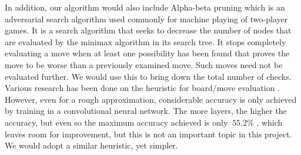 \documentclass[11pt]{article}
\begin{document}
In addition, our algorithm would also include Alpha-beta pruning which is an adversarial search algorithm used commonly for machine playing of two-player games. It is a search algorithm that seeks to decrease the number of nodes that are evaluated by the minimax algorithm in its search tree. It stops completely evaluating a move when at least one possibility has been found that proves the move to be worse than a previously examined move. Such moves need not be evaluated further. We would use this to bring down the total number of checks. \\
Various research has been done on the heuristic for board/move evaluation \cite{ME}. However, even for a rough approximation, considerable accuracy is only achieved by training in a convolutional neural network. The more layers, the higher the accuracy, but even so the maximum accuracy achieved is only $ \ 55.2\%$ \cite{ME}, which leaves room for improvement, but this is not an important topic in this project. We would adopt a similar heuristic, yet simpler. \\
\end{document}

